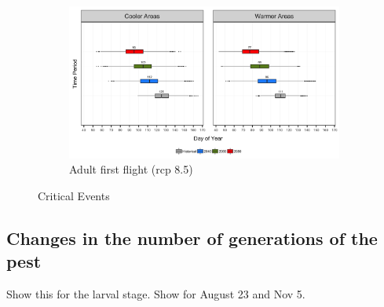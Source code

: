 \documentclass[12pt]{article}
\theoremstyle{plain}
\theoremstyle{definition}
\theoremstyle{definition}
\begin{document}
\begin{figure}[h!]
    \begin{subfigure}[b]{0.43\textwidth}
        \includegraphics[width=\textwidth]{figures/adult_emergence_rcp85}
        \caption{Adult first flight (rcp 8.5)}
        \label{fig:aff_85}
    \end{subfigure}
    \caption{Critical Events}\label{fig:Critical_Events}
\end{figure}
\pagebreak

\subsection{Changes in the number of generations of the pest}
Show this for the larval stage. Show for August 23 and Nov 5.
\end{document}

